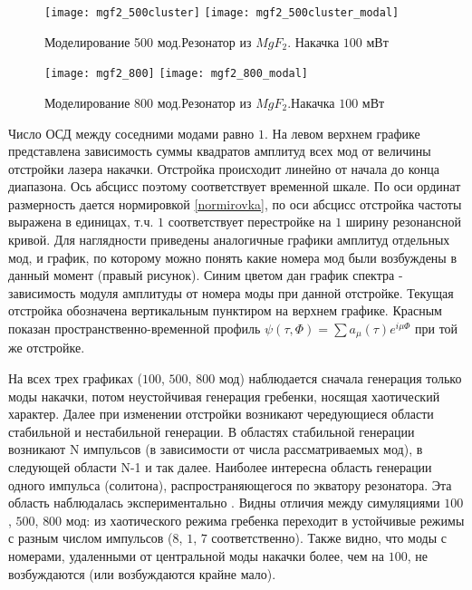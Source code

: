 \begin{figure}
  \texttt{[image: mgf2\_500cluster]}
  \texttt{[image: mgf2\_500cluster\_modal]}
  \caption{Моделирование 500 мод.Резонатор из $MgF_2$. Накачка $100$ мВт} \label{500modes}
\end{figure}

\begin{figure}
  \texttt{[image: mgf2\_800]}
  \texttt{[image: mgf2\_800\_modal]}
  \caption{Моделирование 800 мод.Резонатор из $MgF_2$.Накачка $100$ мВт} \label{800modes}
\end{figure}

Число ОСД между соседними модами равно $1$. На левом верхнем графике представлена зависимость суммы квадратов амплитуд всех мод от величины отстройки лазера накачки. Отстройка происходит линейно от начала до конца диапазона. Ось абсцисс поэтому соответствует временной шкале.  По оси ординат размерность дается нормировкой \eqref{normirovka}, по оси абсцисс отстройка частоты выражена в единицах, т.ч. $1$ соответствует перестройке на $1$ ширину резонансной кривой. Для наглядности приведены аналогичные графики амплитуд отдельных мод, и график, по которому можно понять какие номера мод были возбуждены в данный момент (правый рисунок). Синим цветом дан график спектра - зависимость модуля амплитуды от номера моды при данной отстройке. Текущая отстройка обозначена вертикальным пунктиром на верхнем графике. Красным показан пространственно-временной профиль $\psi(\tau,\Phi)=\sum a_\mu(\tau)e^{i\mu\Phi}$ при той же отстройке.

На всех трех графиках ($100$, $500$, $800$ мод) наблюдается сначала генерация только моды накачки, потом неустойчивая генерация гребенки, носящая хаотический характер. Далее при изменении отстройки возникают чередующиеся области стабильной и нестабильной генерации. В областях стабильной генерации возникают N импульсов (в зависимости от числа рассматриваемых мод), в следующей области N-1 и так далее. Наиболее интересна область генерации одного импульса (солитона), распространяющегося по экватору резонатора. Эта область наблюдалась экспериментально \cite{Herr2014}. Видны отличия между симуляциями $100$, $500$, $800$ мод: из хаотического режима гребенка переходит в устойчивые режимы с разным числом импульсов ($8$, $1$, $7$ соответственно). Также видно, что моды с номерами, удаленными от центральной моды накачки более, чем на $100$, не возбуждаются (или возбуждаются крайне мало).


